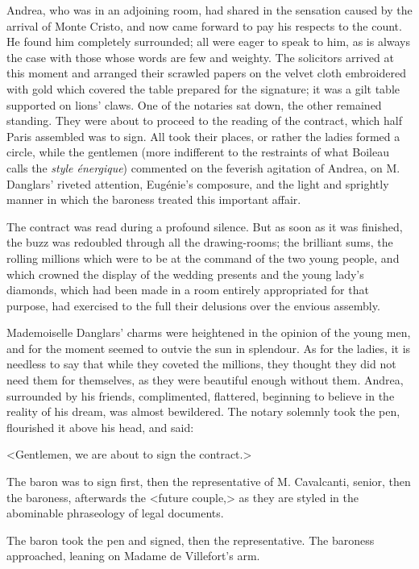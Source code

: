  Andrea, who was in an adjoining room, had shared in the sensation caused by the arrival of Monte Cristo, and now came forward to pay his respects to the count. He found him completely surrounded; all were eager to speak to him, as is always the case with those whose words are few and weighty. The solicitors arrived at this moment and arranged their scrawled papers on the velvet cloth embroidered with gold which covered the table prepared for the signature; it was a gilt table supported on lions' claws. One of the notaries sat down, the other remained standing. They were about to proceed to the reading of the contract, which half Paris assembled was to sign. All took their places, or rather the ladies formed a circle, while the gentlemen (more indifferent to the restraints of what Boileau calls the \textit{style énergique}) commented on the feverish agitation of Andrea, on M. Danglars' riveted attention, Eugénie's composure, and the light and sprightly manner in which the baroness treated this important affair. 

 The contract was read during a profound silence. But as soon as it was finished, the buzz was redoubled through all the drawing-rooms; the brilliant sums, the rolling millions which were to be at the command of the two young people, and which crowned the display of the wedding presents and the young lady's diamonds, which had been made in a room entirely appropriated for that purpose, had exercised to the full their delusions over the envious assembly. 

 Mademoiselle Danglars' charms were heightened in the opinion of the young men, and for the moment seemed to outvie the sun in splendour. As for the ladies, it is needless to say that while they coveted the millions, they thought they did not need them for themselves, as they were beautiful enough without them. Andrea, surrounded by his friends, complimented, flattered, beginning to believe in the reality of his dream, was almost bewildered. The notary solemnly took the pen, flourished it above his head, and said: 

 <Gentlemen, we are about to sign the contract.> 

 The baron was to sign first, then the representative of M. Cavalcanti, senior, then the baroness, afterwards the <future couple,> as they are styled in the abominable phraseology of legal documents. 

 The baron took the pen and signed, then the representative. The baroness approached, leaning on Madame de Villefort's arm. 

